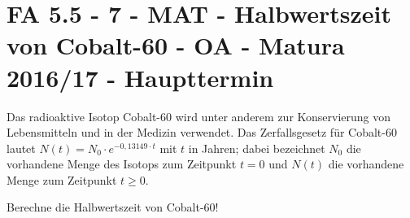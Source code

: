 \section{FA 5.5 - 7 - MAT - Halbwertszeit von Cobalt-60 - OA - Matura 2016/17 - Haupttermin}

\begin{beispiel}[FA 5.5]{1} %
Das radioaktive Isotop Cobalt-60 wird unter anderem zur Konservierung von Lebensmitteln und in
der Medizin verwendet. Das Zerfallsgesetz für Cobalt-60 lautet $N(t) = N_0\cdot e^{-0,13149 \cdot t}$ mit $t$ in Jahren; dabei bezeichnet $N_0$ die vorhandene Menge des Isotops zum Zeitpunkt $t = 0$ und $N(t)$ die vorhandene Menge zum Zeitpunkt $t \geq 0$. \leer

Berechne die Halbwertszeit von Cobalt-60!

\end{beispiel}